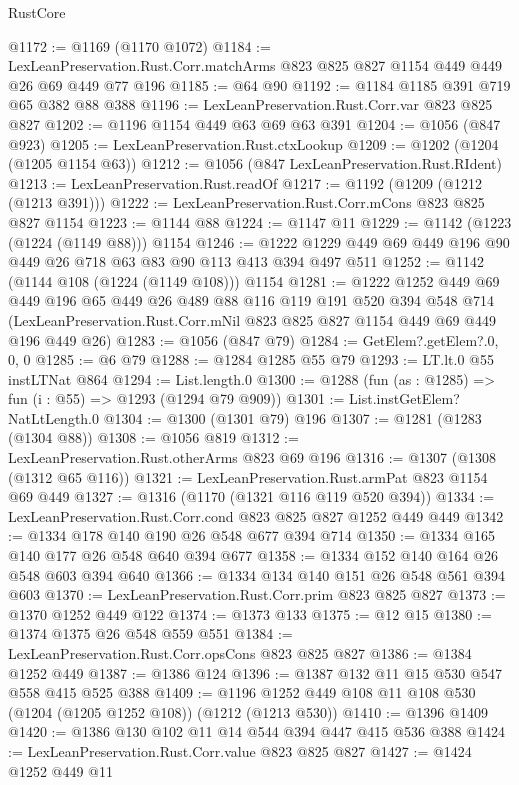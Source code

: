 \begin{lexlean}{RustCore}
\begin{coremodule}
@1172 := @1169 (@1170 @1072)
@1184 := LexLeanPreservation.Rust.Corr.matchArms
    @823
    @825
    @827
    @1154
    @449
    @449
    @26
    @69
    @449
    @77
    @196
@1185 := @64 @90
@1192 := @1184 @1185 @391 @719 @65 @382 @88 @388
@1196 := LexLeanPreservation.Rust.Corr.var @823 @825 @827
@1202 := @1196 @1154 @449 @63 @69 @63 @391
@1204 := @1056 (@847 @923)
@1205 := LexLeanPreservation.Rust.ctxLookup
@1209 := @1202 (@1204 (@1205 @1154 @63))
@1212 := @1056 (@847 LexLeanPreservation.Rust.RIdent)
@1213 := LexLeanPreservation.Rust.readOf
@1217 := @1192 (@1209 (@1212 (@1213 @391)))
@1222 := LexLeanPreservation.Rust.Corr.mCons @823 @825 @827 @1154
@1223 := @1144 @88
@1224 := @1147 @11
@1229 := @1142 (@1223 (@1224 (@1149 @88))) @1154
@1246 := @1222 @1229 @449 @69 @449 @196 @90 @449 @26 @718 @63 @83 @90 @113 @413 @394 @497 @511
@1252 := @1142 (@1144 @108 (@1224 (@1149 @108))) @1154
@1281 := @1222
    @1252
    @449
    @69
    @449
    @196
    @65
    @449
    @26
    @489
    @88
    @116
    @119
    @191
    @520
    @394
    @548
    @714
    (LexLeanPreservation.Rust.Corr.mNil @823 @825 @827 @1154 @449 @69 @449 @196 @449 @26)
@1283 := @1056 (@847 @79)
@1284 := GetElem?.getElem?.{0, 0, 0}
@1285 := @6 @79
@1288 := @1284 @1285 @55 @79
@1293 := LT.lt.{0} @55 instLTNat @864
@1294 := List.length.{0}
@1300 := @1288 (fun (as : @1285) => fun (i : @55) => @1293 (@1294 @79 @909))
@1301 := List.instGetElem?NatLtLength.{0}
@1304 := @1300 (@1301 @79) @196
@1307 := @1281 (@1283 (@1304 @88))
@1308 := @1056 @819
@1312 := LexLeanPreservation.Rust.otherArms @823 @69 @196
@1316 := @1307 (@1308 (@1312 @65 @116))
@1321 := LexLeanPreservation.Rust.armPat @823 @1154 @69 @449
@1327 := @1316 (@1170 (@1321 @116 @119 @520 @394))
@1334 := LexLeanPreservation.Rust.Corr.cond @823 @825 @827 @1252 @449 @449
@1342 := @1334 @178 @140 @190 @26 @548 @677 @394 @714
@1350 := @1334 @165 @140 @177 @26 @548 @640 @394 @677
@1358 := @1334 @152 @140 @164 @26 @548 @603 @394 @640
@1366 := @1334 @134 @140 @151 @26 @548 @561 @394 @603
@1370 := LexLeanPreservation.Rust.Corr.prim @823 @825 @827
@1373 := @1370 @1252 @449 @122
@1374 := @1373 @133
@1375 := @12 @15
@1380 := @1374 @1375 @26 @548 @559 @551
@1384 := LexLeanPreservation.Rust.Corr.opsCons @823 @825 @827
@1386 := @1384 @1252 @449
@1387 := @1386 @124
@1396 := @1387 @132 @11 @15 @530 @547 @558 @415 @525 @388
@1409 := @1196 @1252 @449 @108 @11 @108 @530 (@1204 (@1205 @1252 @108)) (@1212 (@1213 @530))
@1410 := @1396 @1409
@1420 := @1386 @130 @102 @11 @14 @544 @394 @447 @415 @536 @388
@1424 := LexLeanPreservation.Rust.Corr.value @823 @825 @827
@1427 := @1424 @1252 @449 @11

\end{coremodule}
\end{lexlean}

